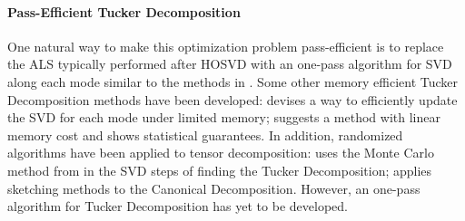 \paragraph{Pass-Efficient Tucker Decomposition} One natural way to make this optimization problem pass-efficient is to replace the ALS typically performed after HOSVD with an one-pass algorithm for SVD along each mode similar to the methods in \citep{clarkson2009numerical, tropp2016randomized}. Some other memory efficient Tucker Decomposition methods have been developed: \cite{kolda2008scalable} devises a way to efficiently update the SVD for each mode under limited memory;  \cite{wang2016online} suggests a method with linear memory cost and shows statistical guarantees. In addition, randomized algorithms have been applied to tensor decomposition: \cite{tsourakakis2010mach} uses the Monte Carlo method from \cite{frieze2004fast} in the SVD steps of finding the Tucker Decomposition;
\cite{erichson2017randomized} applies sketching methods \citep{halko2011finding} to the Canonical Decomposition. However, an one-pass algorithm for Tucker Decomposition has yet to be developed. 
